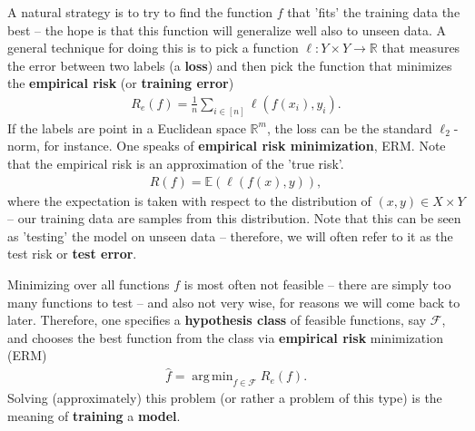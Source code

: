 \documentclass{article}
\DeclareMathOperator*{\argmin}{arg\,min}
\newcommand{\calF}{\mathcal{F}}
\newcommand{\R}{\mathbb{R}}
\begin{document}
A natural strategy is to try to find the function $f$ that 'fits' the training data the best -- the hope is that this function will generalize well also to unseen data. A general technique for doing this is to pick a function $\ell: Y \times Y \to \R$ that measures the error between two labels (a \textbf{loss}) and then pick the function that minimizes the \textbf{empirical risk} (or \textbf{training error})
\begin{align*}
    R_e(f) = \tfrac{1}{n} \sum_{i \in [n]} \ell(f(x_i),y_i).
\end{align*}
If the labels are point in a Euclidean space $\R^m$, the loss can be the standard $\ell_2$-norm, for instance. One speaks of \textbf{empirical risk minimization}, ERM. Note that the empirical risk is an approximation of the 'true risk'. 
\begin{align*}
    R(f) = \mathbb{E}(\ell(f(x),y)),
\end{align*}
where the expectation is taken with respect to the distribution of $(x,y) \in X \times Y$ -- our training data are samples from this distribution. Note that this can be seen as 'testing' the model on unseen data -- therefore, we will often refer to it as the test risk or \textbf{test error}.

Minimizing over all functions $f$ is most often not feasible -- there are simply too many functions to test -- and also not very wise, for reasons we will come back to later. Therefore, one specifies a \textbf{hypothesis class} of feasible functions, say $\calF$, and chooses the best function from the class via \textbf{empirical risk} minimization (ERM) 
\begin{align*}
    \hat{f} = \argmin_{f\in \calF} R_e(f).
\end{align*}
Solving (approximately) this problem (or rather a problem of this type) is the meaning of \textbf{training} a \textbf{model}.
\end{document}

